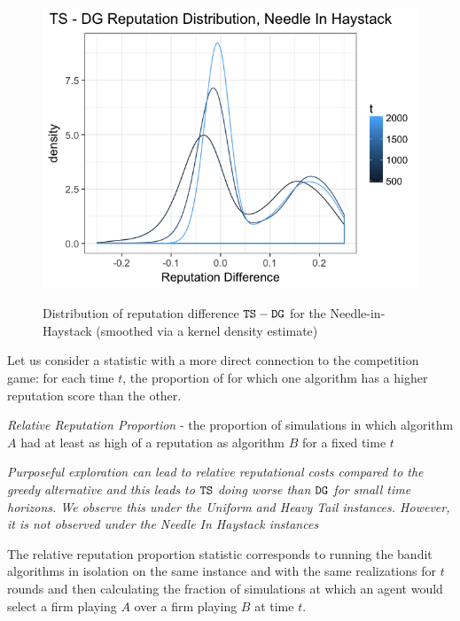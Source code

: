 \documentclass[../competing_bandits.tex]{subfiles}
\begin{document}
\begin{figure}[ht]
\caption{Distribution of reputation difference $\mathtt{TS}-\mathtt{DG}$ for the Needle-in-Haystack (smoothed via a kernel density estimate)}
\includegraphics[scale=0.35]{figures/ts_dg_rep_diff_nih}
\label{ts_dg_rep_diff_nih}
\end{figure}

Let us consider a statistic with a more direct connection to the competition game: for each time $t$, the proportion of \MRVs for which one algorithm has a higher reputation score than the other. 

\begin{definition}
\textit{Relative Reputation Proportion} - the proportion of simulations in which algorithm $A$ had at least as high of a reputation as algorithm $B$ for a fixed time $t$
\end{definition}


\begin{finding}
\textit{Purposeful exploration can lead to relative reputational costs compared to the greedy alternative and this leads to $\mathtt{TS}$ doing worse than $\mathtt{DG}$ for small time horizons. We observe this under the Uniform and Heavy Tail instances. However, it is not observed under the Needle In Haystack instances}
\end{finding}

The relative reputation proportion statistic corresponds to running the bandit algorithms in isolation on the same instance and with the same realizations for $t$ rounds and then calculating the fraction of simulations at which an agent would select a firm playing $A$ over a firm playing $B$ at time $t$.
\end{document}

